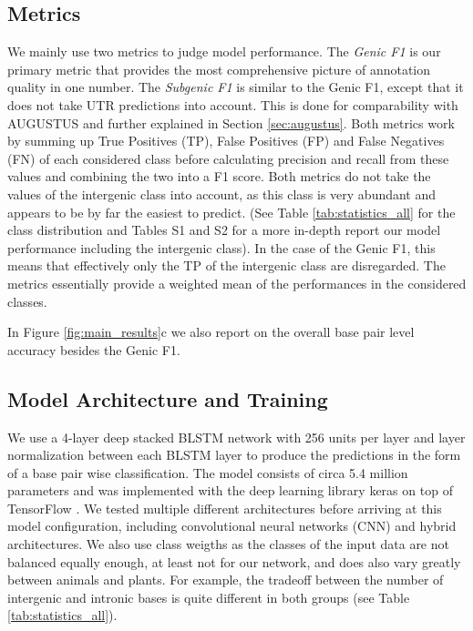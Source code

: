 \documentclass{bioinfo}
\begin{document}
\begin{methods}
\subsection{Metrics}
We mainly use two metrics to judge model performance. The {\it Genic F1} is our primary metric that provides the most comprehensive picture of annotation quality in one number. The {\it Subgenic F1} is similar to the Genic F1, except that it does not take UTR predictions into account. This is done for comparability with AUGUSTUS and further explained in Section \ref{sec:augustus}. Both metrics work by summing up True Positives (TP), False Positives (FP) and False Negatives (FN) of each considered class before calculating precision and recall from these values and combining the two into a F1 score. Both metrics do not take the values of the intergenic class into account, as this class is very abundant and appears to be by far the easiest to predict. (See Table \ref{tab:statistics_all} for the class distribution and Tables S1 and S2 for a more in-depth report our model performance including the intergenic class). In the case of the Genic F1, this means that effectively only the TP of the intergenic class are disregarded. The metrics essentially provide a weighted mean of the performances in the considered classes. 

In Figure \ref{fig:main_results}c we also report on the overall base pair level accuracy besides the Genic F1.

\subsection{Model Architecture and Training}
\label{sec:model}
We use a 4-layer deep stacked BLSTM network with 256 units per layer and layer normalization \citep{ba2016layer} between each BLSTM layer to produce the predictions in the form of a base pair wise classification. The model consists of circa 5.4 million parameters and was implemented with the deep learning library keras \citep{chollet2015keras} on top of TensorFlow \citep{abadi2016tensorflow}. We tested multiple different architectures before arriving at this model configuration, including convolutional neural networks (CNN) and hybrid architectures. We also use class weigths as the classes of the input data are not balanced equally enough, at least not for our network, and does also vary greatly between animals and plants. For example, the tradeoff between the number of intergenic and intronic bases is quite different in both groups (see Table \ref{tab:statistics_all}). 


\end{methods}
\end{document}
